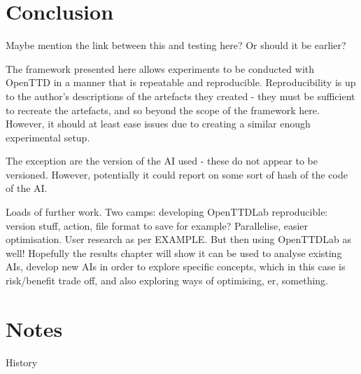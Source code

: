 \documentclass[logo,msc,dsti]{infthesis}    %
\begin{document}
\chapter{Conclusion}

\begin{itemize}
\begin{item}
Maybe mention the link between this and testing here? Or should it be earlier?
\end{item}
\end{itemize}

The framework presented here allows experiments to be conducted with OpenTTD in a manner that is repeatable and reproducible. Reproducibility is up to the author's descriptions of the artefacts they created - they must be sufficient to recreate the artefacts, and so beyond the scope of the framework here. However, it should at least ease issues due to creating a similar enough experimental setup.

The exception are the version of the AI used - these do not appear to be versioned. However, potentially it could report on some sort of hash of the code of the AI.

Loads of further work. Two camps: developing OpenTTDLab reproducible: version stuff, action, file format to save for example? Parallelise, easier optimisation. User research as per EXAMPLE. But then using OpenTTDLab as well! Hopefully the results chapter will show it can be used to analyse existing AIs, develop new AIs in order to explore specific concepts, which in this case is risk/benefit trade off, and also exploring ways of optimising, er, something.

\chapter{Notes}

History
\end{document}
